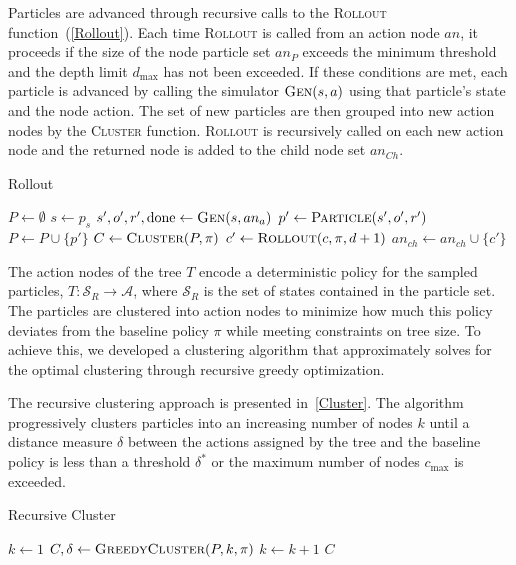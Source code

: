 \documentclass[letterpaper]{article} %
\begin{document}
Particles are advanced through recursive calls to the \textsc{Rollout} function~(\cref{Rollout}).
Each time \textsc{Rollout} is called from an action node $an$, it proceeds if the size of the node particle set $an_P$ exceeds the minimum threshold and the depth limit $d_{\max}$ has not been exceeded.
If these conditions are met, each particle is advanced by calling the simulator $\textsc{Gen}(s, a)$ using that particle's state and the node action.
The set of new particles are then grouped into new action nodes by the \textsc{Cluster} function.
\textsc{Rollout} is recursively called on each new action node and the returned node is added to the child node set $an_{Ch}$.
\begin{algorithm}[ht]
\caption{Rollout}\label{Rollout}
\begin{algorithmic}[1]
            \State $P \gets \emptyset$
                \State $s \gets p_s$
                \State $s', o', r', \text{done} \gets \textsc{Gen}(s, an_a)$
                    \State $p' \gets \textsc{Particle}(s', o', r')$
                    \State $P \gets P \cup \{ p' \}$
                \EndIf
            \EndFor
            \State $C \gets \textsc{Cluster}(P, \pi)$
                \State $c' \gets \textsc{Rollout}(c, \pi, d + 1)$
                \State $an_{ch} \gets an_{ch} \cup \{ c' \}$
            \EndFor
        \EndIf
        \State \Return {}
    \EndProcedure
\end{algorithmic}
\end{algorithm}

The action nodes of the tree $T$ encode a deterministic policy for the sampled particles, $T: \mathcal{S}_R \to \mathcal{A}$, where $\mathcal{S}_R$ is the set of states contained in the particle set.
The particles are clustered into action nodes to minimize how much this policy deviates from the baseline policy $\pi$ while meeting constraints on tree size.
To achieve this, we developed a clustering algorithm that approximately solves for the optimal clustering through recursive greedy optimization.

The recursive clustering approach is presented in~\cref{Cluster}.
The algorithm progressively clusters particles into an increasing number of nodes $k$ until a distance measure $\delta$ between the actions assigned by the tree and the baseline policy is less than a threshold $\delta^*$ or the maximum number of nodes $c_{\max}$ is exceeded.
\begin{algorithm}[ht]
\caption{Recursive Cluster}\label{Cluster}
\begin{algorithmic}[1]
        \State $k \gets 1$
        \Repeat
            \State $C, \delta \gets \textsc{GreedyCluster}(P, k, \pi)$
            \State $k \gets k + 1$
        \State \Return $C$
    \EndProcedure
\end{algorithmic}
\end{algorithm}
\end{document}
